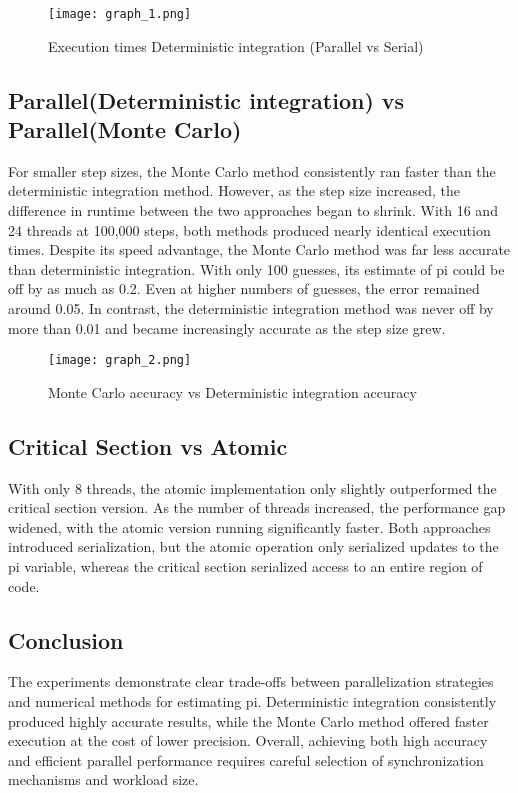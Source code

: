 \documentclass[acmtog]{acmart}
\begin{document}
\begin{figure}[h]
    \centering
    \texttt{[image: graph\_1.png]}
    \caption{Execution times Deterministic integration (Parallel vs Serial)}
    \label{fig:placeholder}
\end{figure}

\subsection{Parallel(Deterministic integration) vs Parallel(Monte Carlo)}
For smaller step sizes, the Monte Carlo method consistently ran faster than the deterministic integration method. However, as the step size increased, the difference in runtime between the two approaches began to shrink. With 16 and 24 threads at 100,000 steps, both methods produced nearly identical execution times. Despite its speed advantage, the Monte Carlo method was far less accurate than deterministic integration. With only 100 guesses, its estimate of pi could be off by as much as 0.2. Even at higher numbers of guesses, the error remained around 0.05. In contrast, the deterministic integration method was never off by more than 0.01 and became increasingly accurate as the step size grew.

\begin{figure}[h]
    \centering
    \texttt{[image: graph\_2.png]}
    \caption{Monte Carlo accuracy vs Deterministic integration accuracy}
    \label{fig:placeholder}
\end{figure}

\subsection{Critical Section vs Atomic}
With only 8 threads, the atomic implementation only slightly outperformed the critical section version. As the number of threads increased, the performance gap widened, with the atomic version running significantly faster. Both approaches introduced serialization, but the atomic operation only serialized updates to the pi variable, whereas the critical section serialized access to an entire region of code.

\subsection{Conclusion}
The experiments demonstrate clear trade-offs between parallelization strategies and numerical methods for estimating pi. Deterministic integration consistently produced highly accurate results, while the Monte Carlo method offered faster execution at the cost of lower precision. Overall, achieving both high accuracy and efficient parallel performance requires careful selection of synchronization mechanisms and workload size.
\end{document}
